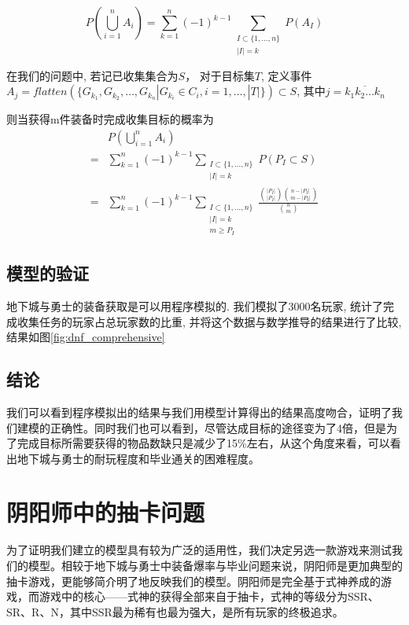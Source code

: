 \documentclass[10pt,journal,compsoc]{IEEEtran}
\begin{document}
  $$
  P(\bigcup_{i=1}^n A_i) = \sum\limits_{k=1}^n (-1)^{k-1} \sum_{\substack{I \subset \{ 1,\dots, n \}\\ |I|=k}} P(A_I)
  $$
  
  在我们的问题中, 若记已收集集合为$S$， 对于目标集$T$, 定义事件$A_j = flatten(\{G_{k_1}, G_{k_2}, \dots, G_{k_n} | G_{k_i} \in C_i, i = 1,\dots,|T|\}) \subset S$, 其中$j=\overline{k_1 k_2 \dots k_n}$
  
  则当获得m件装备时完成收集目标的概率为
  \begin{equation*}
    \begin{split}
      & P(\bigcup_{i=1}^n A_i) \\
      = & \sum\limits_{k=1}^n (-1)^{k-1} \sum_{\substack{I \subset \{ 1,\dots, n \}\\ |I|=k}} P(P_I\subset S)\\
      = & \sum\limits_{k=1}^n (-1)^{k-1} \sum_{\substack{I \subset \{ 1,\dots, n \}\\ |I|=k \\ m \geq P_I}} \frac{\binom{|P_I|}{|P_I|} \binom{n-|P_I|}{m-|P_I|}}{\binom{n}{m}}
    \end{split}
  \end{equation*}

  \subsection{模型的验证}
    地下城与勇士的装备获取是可以用程序模拟的. 我们模拟了3000名玩家, 统计了完成收集任务的玩家占总玩家数的比重, 并将这个数据与数学推导的结果进行了比较, 结果如图\ref{fig:dnf_comprehensive}


  \subsection{结论}
    我们可以看到程序模拟出的结果与我们用模型计算得出的结果高度吻合，证明了我们建模的正确性。同时我们也可以看到，尽管达成目标的途径变为了4倍，但是为了完成目标所需要获得的物品数缺只是减少了15\%左右，从这个角度来看，可以看出地下城与勇士的耐玩程度和毕业通关的困难程度。
    
    


\section{阴阳师中的抽卡问题}
为了证明我们建立的模型具有较为广泛的适用性，我们决定另选一款游戏来测试我们的模型。相较于地下城与勇士中装备爆率与毕业问题来说，阴阳师是更加典型的抽卡游戏，更能够简介明了地反映我们的模型。阴阳师是完全基于式神养成的游戏，而游戏中的核心——式神的获得全部来自于抽卡，式神的等级分为SSR、SR、R、N，其中SSR最为稀有也最为强大，是所有玩家的终极追求。
\end{document}
